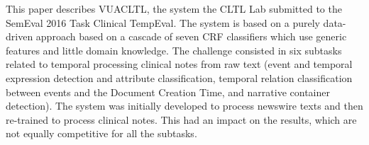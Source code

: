 This paper describes VUACLTL, the system the CLTL Lab submitted to the SemEval 2016 Task Clinical TempEval. The system is based on a purely data-driven approach based on a cascade of seven CRF classifiers which use generic features and little domain knowledge. The challenge consisted in six subtasks related to temporal processing clinical notes from raw text (event and temporal expression detection and attribute classification, temporal relation classification between events and the Document Creation Time, and narrative container detection). The system was initially developed to process newswire texts and then re-trained to process clinical notes. This had an impact on the results, which are not equally competitive for all the subtasks.
